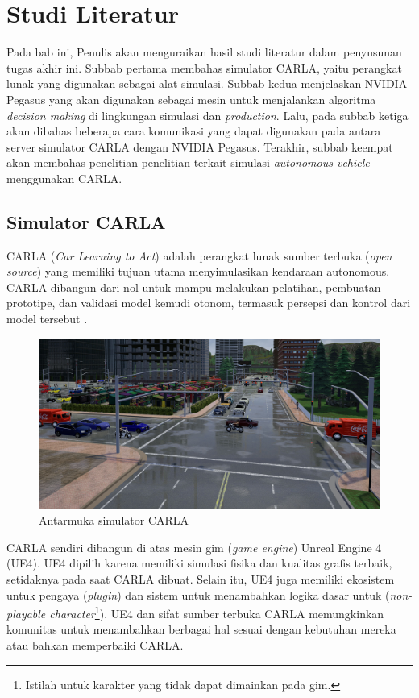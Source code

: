 \chapter{Studi Literatur}

Pada bab ini, Penulis akan menguraikan hasil studi literatur dalam penyusunan
tugas akhir ini. Subbab pertama membahas simulator CARLA, yaitu perangkat lunak
yang digunakan sebagai alat simulasi. Subbab kedua menjelaskan NVIDIA Pegasus
yang akan digunakan sebagai mesin untuk menjalankan algoritma \textit{decision
    making} di lingkungan simulasi dan \textit{production}. Lalu, pada subbab ketiga
akan dibahas beberapa cara komunikasi yang dapat digunakan pada antara server
simulator CARLA dengan NVIDIA Pegasus. Terakhir, subbab keempat akan membahas
penelitian-penelitian terkait simulasi \textit{autonomous vehicle} menggunakan
CARLA.

\section{Simulator CARLA}

CARLA (\textit{Car Learning to Act}) adalah perangkat lunak sumber terbuka
(\textit{o\-pen sour\-ce}) yang memiliki tujuan utama menyimulasikan kendaraan
autonomous. CAR\-LA dibangun dari nol untuk mampu melakukan pelatihan, pembuatan
prototipe, dan validasi model kemudi otonom, termasuk persepsi dan kontrol dari
model tersebut \parencite{dos_carla}.

\begin{figure}
    \centering
    \includegraphics[width=1.0\textwidth]{resources/chapter-2/CARLA.jpg}
    \caption{Antarmuka simulator CARLA \parencite{loze_carlaDemocratizes}}
\end{figure}

CARLA sendiri dibangun di atas mesin gim (\textit{game engine}) Unreal Engine 4
(UE4). UE4 dipilih karena memiliki simulasi fisika dan kualitas grafis terbaik,
setidaknya pada saat CARLA dibuat. Selain itu, UE4 juga memiliki ekosistem untuk
pengaya (\textit{plugin}) dan sistem untuk menambahkan logika dasar untuk
(\textit{non-playable character}\footnote{Istilah untuk karakter yang tidak
    dapat dimainkan pada gim.}). UE4 dan sifat sumber terbuka CARLA memungkinkan
komunitas untuk menambahkan berbagai hal sesuai dengan kebutuhan mereka atau
bahkan memperbaiki CARLA.

